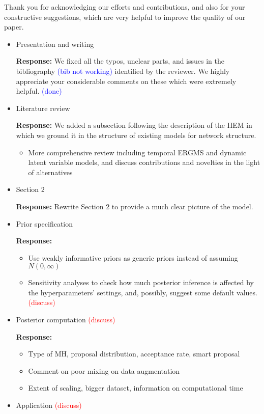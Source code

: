 \documentclass[12pt]{article}
\theoremstyle{definition}
\begin{document}
Thank you for acknowledging our efforts and contributions, and also for your constructive suggestions, which are very helpful to improve the quality of our paper.
\begin{itemize}
	\item Presentation and writing
	
	\textbf{  Response:} We fixed all the typos, unclear parts, and issues in the bibliography \textcolor{blue}{(bib not working)} identified by the reviewer. We highly appreciate your considerable comments on these which were extremely helpful. \textcolor{blue}{(done)}

  \item Literature review

\textbf{  Response:}  We added a subsection following the description of the HEM in which we ground it in the structure of existing models for network structure. 
\begin{itemize}
	\item More comprehensive review including temporal ERGMS and dynamic latent variable models, and discuss contributions and novelties in the light of alternatives
\end{itemize}

\item Section 2

\textbf{  Response:} Rewrite Section 2 to provide a much clear picture of the model.


\item Prior specification

\textbf{  Response:} 
\begin{itemize}
	\item Use weakly informative priors as generic priors instead of assuming $N(0, \infty)$
	\item Sensitivity analyses to check how much posterior inference is affected by the hyperparameters' settings, and, possibly, suggest some default values.  \textcolor{red}{(discuss)} 
\end{itemize}

\item Posterior computation  \textcolor{red}{(discuss)} 

\textbf{  Response:} 
\begin{itemize}
	\item Type of MH, proposal distribution, acceptance rate, smart proposal
	\item Comment on poor mixing on data augmentation
	\item Extent of scaling, bigger dataset, information on computational time
\end{itemize}
\item Application  \textcolor{red}{(discuss)} 


\end{itemize}
\end{document}

